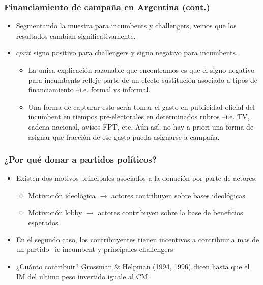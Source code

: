 \documentclass[handout,final,xcolor=dvipsnames]{beamer}
\begin{document}
\begin{frame}\frametitle{Financiamiento de campaña en Argentina (cont.)}
\begin{itemize}\itemsep 15pt
\item Segmentando la muestra para incumbents y challengers, vemos que
  los resultados cambian significativamente.
\item $cprit$ signo positivo para challengers y signo negativo para
  incumbents.
\begin{itemize}
\item La unica explicación razonable que encontramos es que el signo
  negativo para incumbents refleje parte de un efecto sustitución
  asociado a tipos de financiamiento --i.e. formal vs informal.
\item Una forma de capturar esto sería tomar el gasto en publicidad
  oficial del incumbent en tiempos pre-electorales en determinados
  rubros --i.e. TV, cadena nacional, avisos FPT, etc. Aún así, no hay
 a priori una forma de asignar que fracción de ese gasto pueda
 asignarse a campaña.
\end{itemize}
\end{itemize}
\end{frame}


\begin{frame}\frametitle{¿Por qué donar a partidos políticos?}
\begin{itemize}\itemsep 15pt
\item Existen dos motivos principales asociados a la donación por
  parte de actores:
\begin{itemize}
\item Motivación ideológica $\longrightarrow$ actores contribuyen
  sobre bases ideológicas
\item Motivación lobby $\longrightarrow$ actores contribuyen sobre la
  base de beneficios esperados
\end{itemize}
\item En el segundo caso, los contribuyentes tienen incentivos a
  contribuir a mas de un partido --ie incumbent y principales
  challengers
\item ¿Cuánto contribuir? Grossman \& Helpman (1994, 1996) dicen hasta
  que el IM del ultimo peso invertido iguale al CM.
\end{itemize}
\end{frame}
\end{document}
